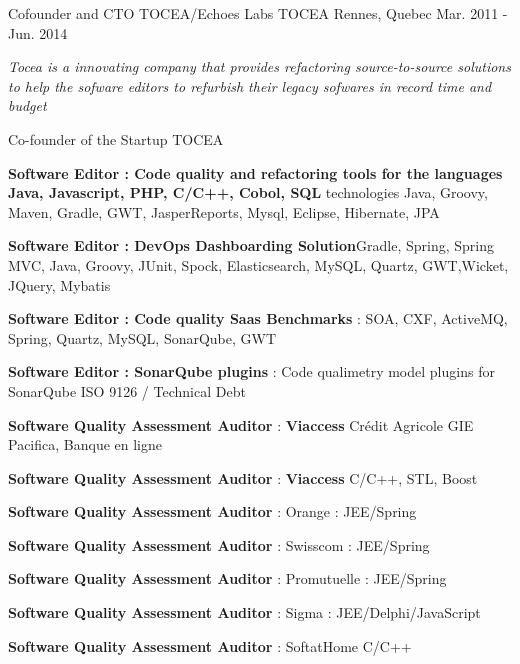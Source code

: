 \begin{cventries}


  \cventry
    {Cofounder and CTO TOCEA/Echoes Labs} %
    {TOCEA} %
    {Rennes, Quebec} %
    {Mar. 2011 - Jun. 2014} %
    {
      \begin{cvitems} %
		 \item {\textit{Tocea is a innovating company that provides refactoring source-to-source solutions to help the sofware editors to refurbish their legacy sofwares in record time and budget}}
		 \item {Co-founder of the Startup TOCEA}        
		 \item {\textbf{Software Editor : Code quality and refactoring tools for the languages Java, Javascript, PHP, C/C++, Cobol, SQL} \newline technologies Java, Groovy, Maven, Gradle, GWT, JasperReports, Mysql, Eclipse, Hibernate, JPA}
		 \item {\textbf{Software Editor : DevOps Dashboarding Solution}\newline Gradle, Spring, Spring MVC, Java, Groovy, JUnit, Spock, Elasticsearch, MySQL, Quartz, GWT,Wicket, JQuery, Mybatis}
         \item {\textbf{Software Editor : Code quality Saas Benchmarks} : SOA, CXF, ActiveMQ, Spring, Quartz, MySQL, SonarQube, GWT}        
         \item {\textbf{Software Editor : SonarQube plugins} : Code qualimetry model plugins for SonarQube ISO 9126 / Technical Debt}        
         \item {\textbf{Software Quality Assessment Auditor} : \textbf{Viaccess} Crédit Agricole GIE Pacifica, Banque en ligne}
         \item {\textbf{Software Quality Assessment Auditor} : \textbf{Viaccess} C/C++, STL, Boost}
         \item {\textbf{Software Quality Assessment Auditor} : Orange : JEE/Spring}                 
		 \item {\textbf{Software Quality Assessment Auditor} : Swisscom : JEE/Spring}          
		 \item {\textbf{Software Quality Assessment Auditor} : Promutuelle : JEE/Spring}
		 \item {\textbf{Software Quality Assessment Auditor} : Sigma : JEE/Delphi/JavaScript}
		 \item {\textbf{Software Quality Assessment Auditor} : SoftatHome C/C++}

\end{cvitems}}
\end{cventries}
